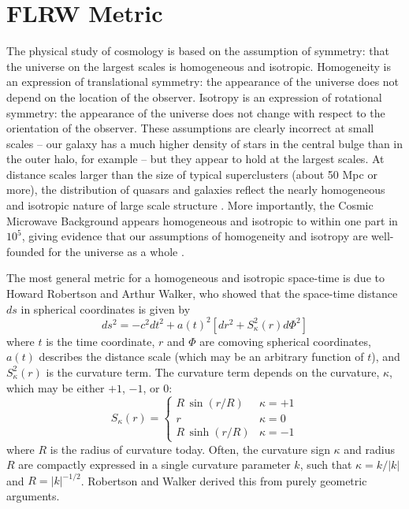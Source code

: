 \section{FLRW Metric}
\label{sec:FLRW}
The physical study of cosmology is based on the assumption of symmetry:
that the universe on the largest scales is homogeneous and isotropic.
Homogeneity is an expression of translational symmetry: the appearance of
the universe does not depend on the location of the observer.  Isotropy
is an expression of rotational symmetry: the appearance of the universe
does not change with respect to the orientation of the observer.
These assumptions are clearly incorrect at small scales -- our galaxy
has a much higher density of stars in the central bulge than in the
outer halo, for example -- but they appear to hold at
the largest scales.
At distance scales larger than the size of typical superclusters
(about 50 Mpc or more), the distribution of
quasars and galaxies reflect the nearly homogeneous and isotropic
nature of large scale structure \citep{Yadav2005, Sarkar2009}.
More importantly, the Cosmic Microwave
Background appears homogeneous and isotropic to within one part in
$10^5$, giving evidence that our assumptions of homogeneity and isotropy
are well-founded for the universe as a whole \citep[For an interesting
discussion of the limits of this approach, however, see][]{Maartens2011}.

The most general metric for a homogeneous and isotropic space-time is due
to Howard Robertson and Arthur Walker, who showed that the space-time
distance $ds$ in spherical coordinates is given by
\begin{equation}
  \label{eq:FLRW_metric}
  ds^2 = -c^2 dt^2 + a(t)^2\left[dr^2 + S_\kappa^2(r)d\Phi^2\right]
\end{equation}
where $t$ is the time coordinate, $r$ and $\Phi$ are comoving spherical
coordinates,
$a(t)$ describes the distance scale (which may be an arbitrary function
of $t$), and $S_\kappa^2(r)$ is the curvature term.  The curvature term
depends on the curvature, $\kappa$, which may be either $+1$, $-1$, or $0$:
\begin{equation}
  \label{eq:FLRW_curvature}
  S_\kappa(r) = \left\{
  \begin{array}{ll}
    R\,\sin(r/R) & \kappa = +1\\
    r & \kappa = 0\\
    R\,\sinh(r/R) & \kappa = -1
  \end{array}
  \right.
\end{equation}
where $R$ is the radius of curvature today.  Often, the curvature
sign $\kappa$ and radius $R$ are compactly expressed in a single curvature
parameter $k$, such that $\kappa = k/|k|$ and $R = |k|^{-1/2}$.
Robertson and Walker derived this from purely geometric arguments.

